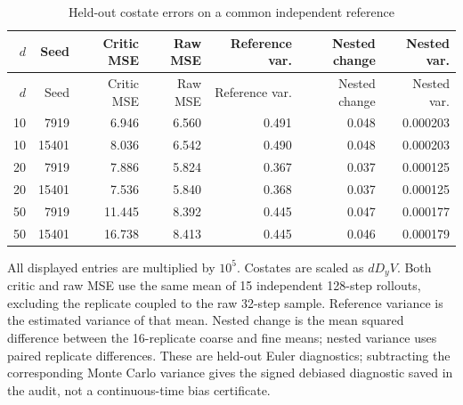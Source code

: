 \begingroup\small\setlength{\tabcolsep}{3pt}
\begin{longtable}{rrrrrrr}
\caption{Held-out costate errors on a common independent reference}\label{tab:r14costates}\\
\toprule
$d$ & Seed & Critic MSE & Raw MSE & Reference var. & Nested change & Nested var.\\\midrule
\endfirsthead
\toprule
$d$ & Seed & Critic MSE & Raw MSE & Reference var. & Nested change & Nested var.\\\midrule
\endhead
10 & 7919 & 6.946 & 6.560 & 0.491 & 0.048 & 0.000203\\
10 & 15401 & 8.036 & 6.542 & 0.490 & 0.048 & 0.000203\\
20 & 7919 & 7.886 & 5.824 & 0.367 & 0.037 & 0.000125\\
20 & 15401 & 7.536 & 5.840 & 0.368 & 0.037 & 0.000125\\
50 & 7919 & 11.445 & 8.392 & 0.445 & 0.047 & 0.000177\\
50 & 15401 & 16.738 & 8.413 & 0.445 & 0.046 & 0.000179\\
\bottomrule\end{longtable}
\noindent All displayed entries are multiplied by $10^5$. Costates are scaled as $dD_yV$. Both critic and raw MSE use the same mean of 15 independent 128-step rollouts, excluding the replicate coupled to the raw 32-step sample. Reference variance is the estimated variance of that mean. Nested change is the mean squared difference between the 16-replicate coarse and fine means; nested variance uses paired replicate differences. These are held-out Euler diagnostics; subtracting the corresponding Monte Carlo variance gives the signed debiased diagnostic saved in the audit, not a continuous-time bias certificate.
\endgroup
